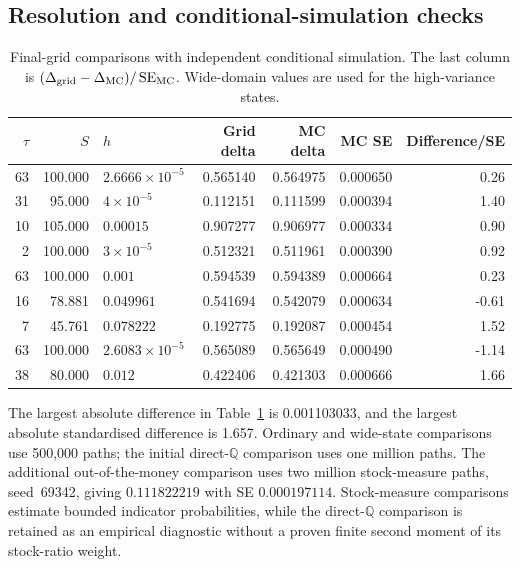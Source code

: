 \documentclass[11pt,a4paper]{article}
\newcommand{\Q}{\mathbb Q}
\newcommand{\SE}{\operatorname{SE}}
\theoremstyle{remark}
\begin{document}
\subsection{Resolution and conditional-simulation checks}
\begin{table}[htbp]
\centering\small
\caption{Final-grid comparisons with independent conditional simulation. The last column is $(\Delta_{\rm grid}-\Delta_{\rm MC})/\SE_{\rm MC}$. Wide-domain values are used for the high-variance states.}
\label{tab:deltachecks}
\begin{tabular}{@{}rrlrrrr@{}}
\toprule
$\tau$ & $S$ & $h$ & Grid delta & MC delta & MC SE & Difference/SE\\
\midrule
63 & 100.000 & $2.6666\times 10^{-5}$ & 0.565140 & 0.564975 & 0.000650 & 0.26 \\
31 & 95.000 & $4\times 10^{-5}$ & 0.112151 & 0.111599 & 0.000394 & 1.40 \\
10 & 105.000 & $0.00015$ & 0.907277 & 0.906977 & 0.000334 & 0.90 \\
2 & 100.000 & $3\times 10^{-5}$ & 0.512321 & 0.511961 & 0.000390 & 0.92 \\
63 & 100.000 & $0.001$ & 0.594539 & 0.594389 & 0.000664 & 0.23 \\
16 & 78.881 & $0.049961$ & 0.541694 & 0.542079 & 0.000634 & -0.61 \\
7 & 45.761 & $0.078222$ & 0.192775 & 0.192087 & 0.000454 & 1.52 \\
63 & 100.000 & $2.6083\times 10^{-5}$ & 0.565089 & 0.565649 & 0.000490 & -1.14 \\
38 & 80.000 & $0.012$ & 0.422406 & 0.421303 & 0.000666 & 1.66 \\
\bottomrule
\end{tabular}
\end{table}
The largest absolute difference in Table~\ref{tab:deltachecks} is 0.001103033, and the largest absolute standardised difference is 1.657. Ordinary and wide-state comparisons use 500,000 paths; the initial direct-$\Q$ comparison uses one million paths. The additional out-of-the-money comparison uses two million stock-measure paths, seed~69342, giving $0.111822219$ with SE $0.000197114$. Stock-measure comparisons estimate bounded indicator probabilities, while the direct-$\Q$ comparison is retained as an empirical diagnostic without a proven finite second moment of its stock-ratio weight.
\end{document}
